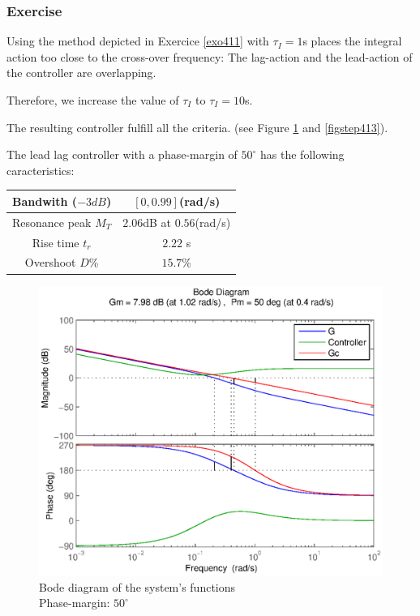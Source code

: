 \subsubsection{Exercise}

Using the method depicted in Exercice \ref{exo411} with $\tau_I = 1$s places the integral action too close to the cross-over frequency: The lag-action and the lead-action of the controller are overlapping.

Therefore, we increase the value of $\tau_I$ to $\tau_I = 10$s.

The resulting controller fulfill all the criteria. (see Figure \ref{figbode413} and \ref{figstep413}).

The lead lag controller with a phase-margin of $50^{\circ}$ has the following caracteristics:
\begin{center}
\begin{tabular}{|c|c|}
    \hline
    Bandwith ($-3dB$) & $[0,0.99]$(rad/s)\\
    \hline
    Resonance peak $M_T$ & $2.06$dB at $0.56$(rad/s)\\
    \hline
    Rise time $t_r$ & $2.22$ s\\
    \hline
    Overshoot $D$\% & $15.7$\%\\
    \hline
\end{tabular}
\end{center}

\begin{figure}[h!b]
   \includegraphics[width=\columnwidth]{fig/bode413.eps}
    \caption{Bode diagram of the system's functions \\ Phase-margin: $50^{\circ}$} 
    \label{figbode413}
\end{figure}


